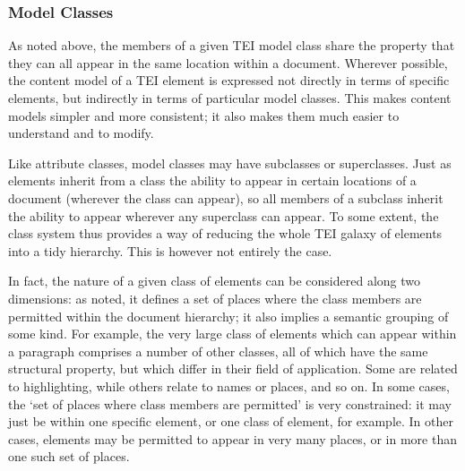 \subsubsection[{Model Classes}]{Model Classes}\label{STECCM}\par
As noted above, the members of a given TEI model class share the property that they can all appear in the same location within a document. Wherever possible, the content model of a TEI element is expressed not directly in terms of specific elements, but indirectly in terms of particular model classes. This makes content models simpler and more consistent; it also makes them much easier to understand and to modify.\par
Like attribute classes, model classes may have subclasses or superclasses. Just as elements inherit from a class the ability to appear in certain locations of a document (wherever the class can appear), so all members of a subclass inherit the ability to appear wherever any superclass can appear. To some extent, the class system thus provides a way of reducing the whole TEI galaxy of elements into a tidy hierarchy. This is however not entirely the case.\par
In fact, the nature of a given class of elements can be considered along two dimensions: as noted, it defines a set of places where the class members are permitted within the document hierarchy; it also implies a semantic grouping of some kind. For example, the very large class of elements which can appear within a paragraph comprises a number of other classes, all of which have the same structural property, but which differ in their field of application. Some are related to highlighting, while others relate to names or places, and so on. In some cases, the ‘set of places where class members are permitted’ is very constrained: it may just be within one specific element, or one class of element, for example. In other cases, elements may be permitted to appear in very many places, or in more than one such set of places.\par
